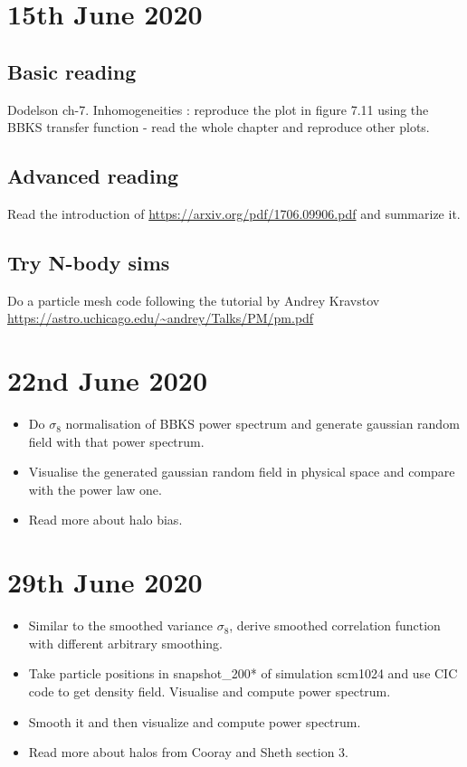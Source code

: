 \documentclass[12pt]{article}
\begin{document}
	



\section{15th June 2020}

\subsection{Basic reading}
Dodelson ch-7. Inhomogeneities : reproduce the plot in figure 7.11 using the BBKS transfer function - read the whole chapter and reproduce other plots.

\subsection{Advanced reading}
Read the introduction of \url{https://arxiv.org/pdf/1706.09906.pdf} and summarize it.

\subsection{Try N-body sims}
Do a particle mesh code following the tutorial by Andrey Kravstov \url{https://astro.uchicago.edu/~andrey/Talks/PM/pm.pdf} 


\section{22nd June 2020}

\begin{itemize}
\item Do $\sigma_8$ normalisation of BBKS power spectrum and generate gaussian random field with that power spectrum.
\item  Visualise the generated gaussian random field in physical space and compare with the power law one.
\item Read more about halo bias.
\end{itemize}
 
 
\section{29th June 2020}
\begin{itemize}
\item Similar to the smoothed variance $\sigma_8$, derive smoothed correlation function with different arbitrary smoothing.
\item Take particle positions in {snapshot\_200*} of simulation scm1024 and use CIC code to get density field. Visualise and compute power spectrum.
\item Smooth it and then visualize and compute power spectrum.
\item Read more about halos from Cooray and Sheth section 3.
\end{itemize}
 
\end{document}

